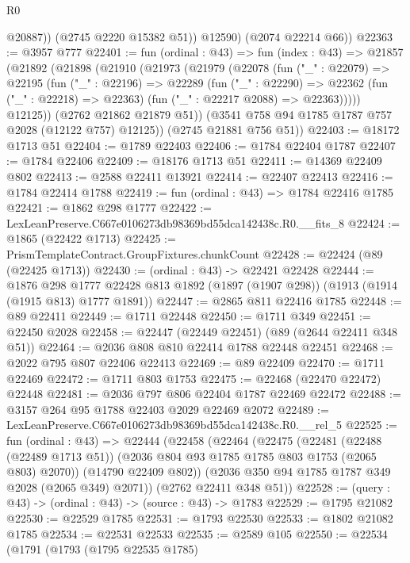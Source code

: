 \begin{lexlean}{R0}
\begin{coremodule}
              @20887))
          (@2745 @2220 @15382 @51))
        @12590)
      (@2074 @22214 @66))
@22363 := @3957 @777
@22401 := fun (ordinal : @43) =>
  fun (index : @43) =>
  @21857
    (@21892
      (@21898
        (@21910
          (@21973
            (@21979
              (@22078
                (fun ("_" : @22079) =>
                @22195
                  (fun ("_" : @22196) =>
                  @22289
                    (fun ("_" : @22290) =>
                    @22362 (fun ("_" : @22218) => @22363) (fun ("_" : @22217 @2088) => @22363)))))
              @12125))
          (@2762 @21862 @21879 @51))
        (@3541 @758 @94 @1785 @1787 @757 @2028 (@12122 @757) @12125))
      (@2745 @21881 @756 @51))
@22403 := @18172 @1713 @51
@22404 := @1789 @22403
@22406 := @1784 @22404 @1787
@22407 := @1784 @22406
@22409 := @18176 @1713 @51
@22411 := @14369 @22409 @802
@22413 := @2588 @22411 @13921
@22414 := @22407 @22413
@22416 := @1784 @22414 @1788
@22419 := fun (ordinal : @43) => @1784 @22416 @1785
@22421 := @1862 @298 @1777
@22422 := LexLeanPreserve.C667e0106273db98369bd55dca142438c.R0.__fits_8
@22424 := @1865 (@22422 @1713)
@22425 := PrismTemplateContract.GroupFixtures.chunkCount
@22428 := @22424 (@89 (@22425 @1713))
@22430 := (ordinal : @43) -> @22421 @22428
@22444 := @1876
    @298
    @1777
    @22428
    @813
    @1892
    (@1897 (@1907 @298))
    (@1913 (@1914 (@1915 @813) @1777 @1891))
@22447 := @2865 @811 @22416 @1785
@22448 := @89 @22411
@22449 := @1711 @22448
@22450 := @1711 @349
@22451 := @22450 @2028
@22458 := @22447 (@22449 @22451) (@89 (@2644 @22411 @348 @51))
@22464 := @2036 @808 @810 @22414 @1788 @22448 @22451
@22468 := @2022 @795 @807 @22406 @22413
@22469 := @89 @22409
@22470 := @1711 @22469
@22472 := @1711 @803 @1753
@22475 := @22468 (@22470 @22472) @22448
@22481 := @2036 @797 @806 @22404 @1787 @22469 @22472
@22488 := @3157 @264 @95 @1788 @22403 @2029 @22469 @2072
@22489 := LexLeanPreserve.C667e0106273db98369bd55dca142438c.R0.__rel_5
@22525 := fun (ordinal : @43) =>
  @22444
    (@22458
      (@22464
        (@22475
          (@22481
            (@22488 (@22489 @1713 @51))
            (@2036 @804 @93 @1785 @1785 @803 @1753 (@2065 @803) @2070))
          (@14790 @22409 @802))
        (@2036 @350 @94 @1785 @1787 @349 @2028 (@2065 @349) @2071))
      (@2762 @22411 @348 @51))
@22528 := (query : @43) -> (ordinal : @43) -> (source : @43) -> @1783
@22529 := @1795 @21082
@22530 := @22529 @1785
@22531 := @1793 @22530
@22533 := @1802 @21082 @1785
@22534 := @22531 @22533
@22535 := @2589 @105
@22550 := @22534
    (@1791
      (@1793
        (@1795 @22535 @1785)

\end{coremodule}
\end{lexlean}
